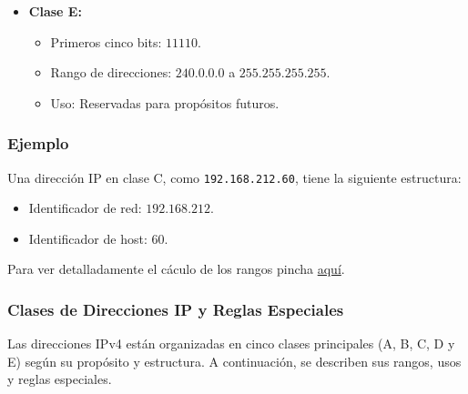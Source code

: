 \documentclass[a4paper,12pt]{article}
\begin{document}
\begin{itemize}
    \item \textbf{Clase E:}
    \begin{itemize}
        \item Primeros cinco bits: \(11110\).
        \item Rango de direcciones: \(240.0.0.0\) a \(255.255.255.255\).
        \item Uso: Reservadas para propósitos futuros.
    \end{itemize}
\end{itemize}

\subsubsection*{Ejemplo}
Una dirección IP en clase C, como \texttt{192.168.212.60}, tiene la siguiente estructura:
\begin{itemize}
    \item Identificador de red: \(192.168.212\).
    \item Identificador de host: \(60\).
\end{itemize}


Para ver detalladamente el cáculo de los rangos pincha \href{https://github.com/ElblogdeIsmael/ElblogdeIsmael.github.io/blob/main/Asignaturas/Tercer%20A%C3%B1o/FR/Resumenes/ETSIIT/rangosIPcalculo.md}{aquí}.

\subsubsection{Clases de Direcciones IP y Reglas Especiales}

Las direcciones IPv4 están organizadas en cinco clases principales (A, B, C, D y E) según su propósito y estructura. A continuación, se describen sus rangos, usos y reglas especiales.
\end{document}
